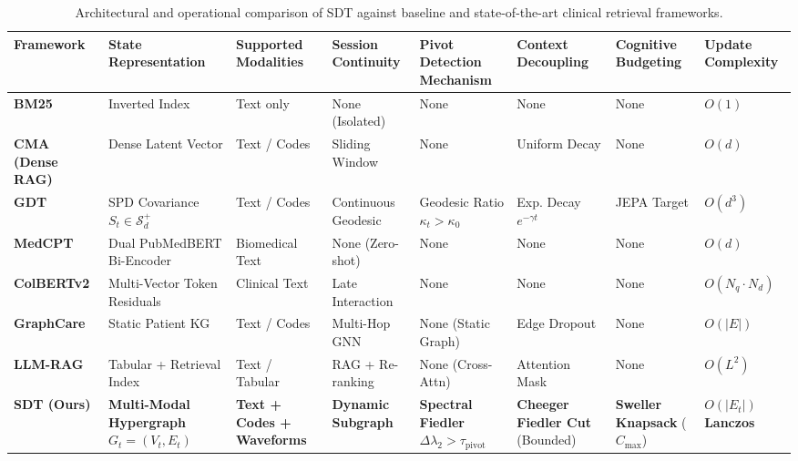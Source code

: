 \documentclass[10pt, onecolumn]{article}
\begin{document}
\begin{table}[t]
  \centering
  \caption{Architectural and operational comparison of SDT against baseline and state-of-the-art clinical retrieval frameworks.}
  \label{tab:framework_comparison}
  \footnotesize
  \begin{tabular}{@{}lp{2.4cm}p{1.8cm}p{1.6cm}p{2.2cm}p{1.8cm}p{1.8cm}p{1.4cm}@{}}
    \toprule
    \textbf{Framework} & \textbf{State Representation} & \textbf{Supported Modalities} & \textbf{Session Continuity} & \textbf{Pivot Detection Mechanism} & \textbf{Context Decoupling} & \textbf{Cognitive Budgeting} & \textbf{Update Complexity} \\
    \midrule
    \textbf{BM25} \cite{baeza1999modern} & Inverted Index & Text only & None (Isolated) & None & None & None & $O(1)$ \\
    \textbf{CMA (Dense RAG)} \cite{lewis2020retrieval} & Dense Latent Vector & Text / Codes & Sliding Window & None & Uniform Decay & None & $O(d)$ \\
    \textbf{GDT} & SPD Covariance $S_t \in \mathcal{S}_d^+$ & Text / Codes & Continuous Geodesic & Geodesic Ratio $\kappa_t > \kappa_0$ & Exp. Decay $e^{-\gamma t}$ & JEPA Target & $O(d^3)$ \\
    \textbf{MedCPT} \cite{jin2023medcpt} & Dual PubMedBERT Bi-Encoder & Biomedical Text & None (Zero-shot) & None & None & None & $O(d)$ \\
    \textbf{ColBERTv2} \cite{santhanam2022colbertv2} & Multi-Vector Token Residuals & Clinical Text & Late Interaction & None & None & None & $O(N_q \cdot N_d)$ \\
    \textbf{GraphCare} \cite{jiang2024graphcare} & Static Patient KG & Text / Codes & Multi-Hop GNN & None (Static Graph) & Edge Dropout & None & $O(|E|)$ \\
    \textbf{LLM-RAG} \cite{eickhoff2024ehrrag,zakka2024almanac} & Tabular + Retrieval Index & Text / Tabular & RAG + Re-ranking & None (Cross-Attn) & Attention Mask & None & $O(L^2)$ \\
    \midrule
    \textbf{SDT (Ours)} & \textbf{Multi-Modal Hypergraph} $G_t=(V_t,E_t)$ & \textbf{Text + Codes + Waveforms} & \textbf{Dynamic Subgraph} & \textbf{Spectral Fiedler} $\Delta\lambda_2 > \tau_{\text{pivot}}$ & \textbf{Cheeger Fiedler Cut} (Bounded) & \textbf{Sweller Knapsack} ($C_{\max}$) & \textbf{$O(|E_t|)$ Lanczos} \\
    \bottomrule
  \end{tabular}
\end{table}
\end{document}
